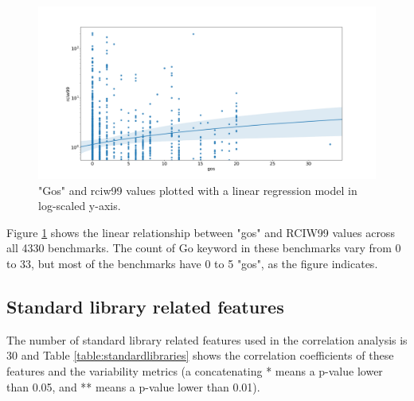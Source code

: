 \documentclass{seal_thesis}
\begin{document}
\begin{figure}[H]
	\centering
	\includegraphics[width=\textwidth]{gosregression}
	\caption{"Gos" and rciw99 values plotted with a linear regression model in log-scaled y-axis.}
	\label{fig:gosregression}
\end{figure}

\noindent Figure \ref{fig:gosregression} shows the linear relationship between "gos" and RCIW99 values across all 4330 benchmarks. The count of Go keyword in these benchmarks vary from 0 to 33, but most of the benchmarks have 0 to 5 "gos", as the figure indicates.

\subsection{Standard library related features}
\label{Standard library related features}

The number of standard library related features used in the correlation analysis is 30 and Table \ref{table:standardlibraries} shows the correlation coefficients of these features and the variability metrics (a concatenating * means a p-value lower than 0.05, and ** means a p-value lower than 0.01). 
\end{document}
